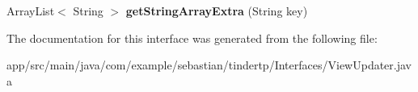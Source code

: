 \begin{DoxyCompactItemize}
\item 
Array\+List$<$ String $>$ {\bfseries get\+String\+Array\+Extra} (String key)\hypertarget{interfacecom_1_1example_1_1sebastian_1_1tindertp_1_1Interfaces_1_1ViewUpdater_a85ea0a50ad87c065b1e1b67f8a7ed343}{}\label{interfacecom_1_1example_1_1sebastian_1_1tindertp_1_1Interfaces_1_1ViewUpdater_a85ea0a50ad87c065b1e1b67f8a7ed343}

\end{DoxyCompactItemize}


The documentation for this interface was generated from the following file\+:\begin{DoxyCompactItemize}
\item 
app/src/main/java/com/example/sebastian/tindertp/\+Interfaces/View\+Updater.\+java\end{DoxyCompactItemize}
